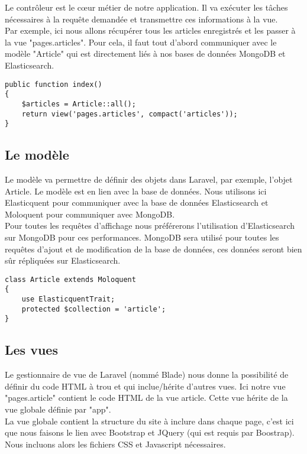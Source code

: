 Le contrôleur est le cœur métier de notre application. Il va exécuter les tâches nécessaires à la requête demandée et transmettre ces informations à la vue.\\
Par exemple, ici nous allons récupérer tous les articles enregistrés et les passer à la vue "pages.articles". Pour cela, il faut tout d'abord communiquer avec le modèle "Article" qui est directement liés à nos bases de données MongoDB et Elasticsearch.

\begin{verbatim}
public function index()
{
    $articles = Article::all();
    return view('pages.articles', compact('articles'));
}
\end{verbatim}

\subsection{Le modèle}
Le modèle va permettre de définir des objets dans Laravel, par exemple, l'objet Article. Le modèle est en lien avec la base de données. Nous utilisons ici Elasticquent\cite{GitElasticquent} pour communiquer avec la base de données Elasticsearch et Moloquent\cite{GitLaravelMongo} pour communiquer avec MongoDB.\\ Pour toutes les requêtes d'affichage nous préférerons l'utilisation d'Elasticsearch sur MongoDB pour ces performances. MongoDB sera utilisé pour toutes les requêtes d'ajout et de modification de la base de données, ces données seront bien sûr répliquées sur Elasticsearch.

\begin{verbatim}
class Article extends Moloquent
{
    use ElasticquentTrait;
    protected $collection = 'article';
}
\end{verbatim}

\subsection{Les vues}

Le gestionnaire de vue de Laravel (nommé Blade) nous donne la possibilité de définir du code HTML à trou et qui inclue/hérite d'autres vues. Ici notre vue "pages.article" contient le code HTML de la vue article. Cette vue hérite de la vue globale définie par "app".\\
La vue globale contient la structure du site à inclure dans chaque page, c'est ici que nous faisons le lien avec Bootstrap\cite{Bootstrap} et JQuery (qui est requis par Boostrap). Nous incluons alors les fichiers CSS et Javascript nécessaires.

